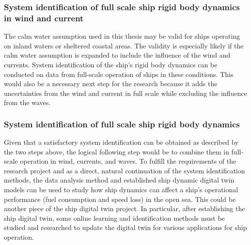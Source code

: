 \subsubsection*{System identification of full scale ship rigid body dynamics in wind and current}
The calm water assumption used in this thesis may be valid for ships operating on inland waters or sheltered coastal areas. The validity is especially likely if the calm water assumption is expanded to include the influence of the wind and currents. System identification of the ship's rigid body dynamics can be conducted on data from full-scale operation of ships in these conditions. This would also be a necessary next step for the research because it adds the uncertainties from the wind and current in full scale while excluding the influence from the waves.

\subsubsection*{System identification of full scale ship rigid body dynamics}
Given that a satisfactory system identification can be obtained as described by the two steps above, the logical following step would be to combine them in full-scale operation in wind, currents, and waves. To fulfill the requirements of the research project and as a direct, natural continuation of the system identification methods, the data analysis method and established ship dynamic digital twin models can be used to study how ship dynamics can affect a ship's operational performance (fuel consumption and speed loss) in the open sea. This could be another piece of the ship digital twin project. In particular, after establishing the ship digital twin, some online learning and identification methods must be studied and researched to update the digital twin for various applications for ship operation.